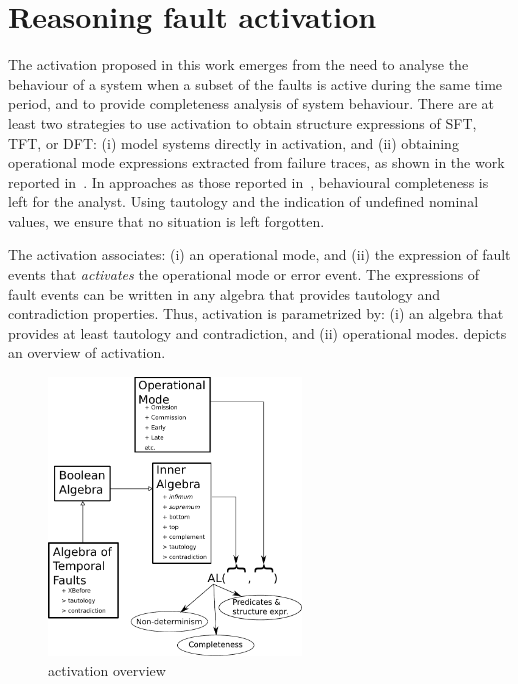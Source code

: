 \documentclass[12pt,openright,twoside,a4paper,oldfontcommands,english,brazil,final]{abntex2}
\theoremstyle{theo}
\begin{document}
\chapter{Reasoning fault activation}
\label{chap:activation}

The \ac{activation} proposed in this work emerges from the need to analyse the behaviour of a system when a subset of the faults is active during the same time period, and to provide completeness analysis of system behaviour.
%
There are at least two strategies to use \ac{activation} to obtain structure expressions of \ac{SFT}, \ac{TFT}, or \ac{DFT}: (i) model systems directly in \ac{activation}, and (ii) obtaining operational mode expressions extracted from failure traces, as shown in the work reported in~\cite{DM2016}.
%
In approaches as those reported in~\cite{WP2009,Merle2010}, behavioural completeness is left for the analyst.
Using tautology and the indication of undefined nominal values, we ensure that no situation is left forgotten.

The \ac{activation} associates: (i) an operational mode, and (ii) the expression of fault events that \emph{activates} the operational mode or error event.
The expressions of fault events can be written in any algebra that provides tautology and contradiction properties.
Thus, \ac{activation} is parametrized by: (i) an algebra that provides at least tautology and contradiction, and (ii) operational modes.
 depicts an overview of \ac{activation}.
%
\begin{figure}[ht]
  \centering
  \includegraphics[width=0.6\textwidth]{logic-overview}
  \caption{\Ac{activation} overview}
  \label{fig:logic-overview}
\end{figure}
\end{document}
